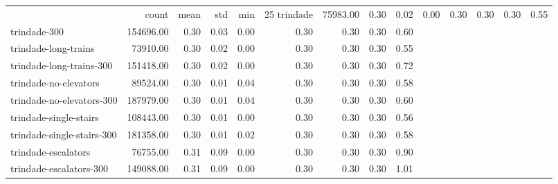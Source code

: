\begin{tabular}{lrrrrrrrr}
 & count & mean & std & min & 25%
trindade & 75983.00 & 0.30 & 0.02 & 0.00 & 0.30 & 0.30 & 0.30 & 0.55 \\
trindade-300 & 154696.00 & 0.30 & 0.03 & 0.00 & 0.30 & 0.30 & 0.30 & 0.60 \\
trindade-long-trains & 73910.00 & 0.30 & 0.02 & 0.00 & 0.30 & 0.30 & 0.30 & 0.55 \\
trindade-long-trains-300 & 151418.00 & 0.30 & 0.02 & 0.00 & 0.30 & 0.30 & 0.30 & 0.72 \\
trindade-no-elevators & 89524.00 & 0.30 & 0.01 & 0.04 & 0.30 & 0.30 & 0.30 & 0.58 \\
trindade-no-elevators-300 & 187979.00 & 0.30 & 0.01 & 0.04 & 0.30 & 0.30 & 0.30 & 0.60 \\
trindade-single-stairs & 108443.00 & 0.30 & 0.01 & 0.00 & 0.30 & 0.30 & 0.30 & 0.56 \\
trindade-single-stairs-300 & 181358.00 & 0.30 & 0.01 & 0.02 & 0.30 & 0.30 & 0.30 & 0.58 \\
trindade-escalators & 76755.00 & 0.31 & 0.09 & 0.00 & 0.30 & 0.30 & 0.30 & 0.90 \\
trindade-escalators-300 & 149088.00 & 0.31 & 0.09 & 0.00 & 0.30 & 0.30 & 0.30 & 1.01 \\
\end{tabular}
